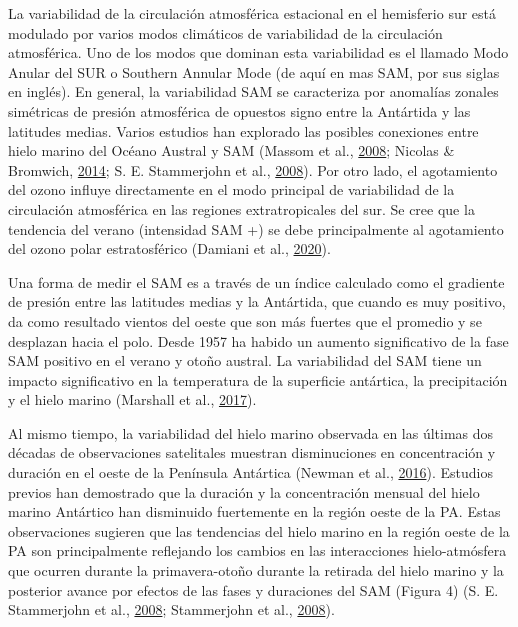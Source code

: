 \documentclass[
]{article}
\begin{document}
La variabilidad de la circulación atmosférica estacional en el
hemisferio sur está modulado por varios modos climáticos de variabilidad
de la circulación atmosférica. Uno de los modos que dominan esta
variabilidad es el llamado Modo Anular del SUR o Southern Annular Mode
(de aquí en mas SAM, por sus siglas en inglés). En general, la
variabilidad SAM se caracteriza por anomalías zonales simétricas de
presión atmosférica de opuestos signo entre la Antártida y las latitudes
medias. Varios estudios han explorado las posibles conexiones entre
hielo marino del Océano Austral y SAM (Massom et al.,
\protect\hyperlink{ref-Massom2008}{2008}; Nicolas \& Bromwich,
\protect\hyperlink{ref-Nicolas2014}{2014}; S. E. Stammerjohn et al.,
\protect\hyperlink{ref-Stammerjohn2008}{2008}). Por otro lado, el
agotamiento del ozono influye directamente en el modo principal de
variabilidad de la circulación atmosférica en las regiones
extratropicales del sur. Se cree que la tendencia del verano (intensidad
SAM +) se debe principalmente al agotamiento del ozono polar
estratosférico (Damiani et al.,
\protect\hyperlink{ref-Damiani2020}{2020}).

Una forma de medir el SAM es a través de un índice calculado como el
gradiente de presión entre las latitudes medias y la Antártida, que
cuando es muy positivo, da como resultado vientos del oeste que son más
fuertes que el promedio y se desplazan hacia el polo. Desde 1957 ha
habido un aumento significativo de la fase SAM positivo en el verano y
otoño austral. La variabilidad del SAM tiene un impacto significativo en
la temperatura de la superficie antártica, la precipitación y el hielo
marino (Marshall et al., \protect\hyperlink{ref-Marshall2017}{2017}).

\pagebreak

Al mismo tiempo, la variabilidad del hielo marino observada en las
últimas dos décadas de observaciones satelitales muestran disminuciones
en concentración y duración en el oeste de la Península Antártica
(Newman et al., \protect\hyperlink{ref-Newman2016}{2016}). Estudios
previos han demostrado que la duración y la concentración mensual del
hielo marino Antártico han disminuido fuertemente en la región oeste de
la PA. Estas observaciones sugieren que las tendencias del hielo marino
en la región oeste de la PA son principalmente reflejando los cambios en
las interacciones hielo-atmósfera que ocurren durante la primavera-otoño
durante la retirada del hielo marino y la posterior avance por efectos
de las fases y duraciones del SAM (Figura 4) (S. E. Stammerjohn et al.,
\protect\hyperlink{ref-Stammerjohn2008}{2008}; Stammerjohn et al.,
\protect\hyperlink{ref-Stammerjohn2008a}{2008}).
\end{document}
